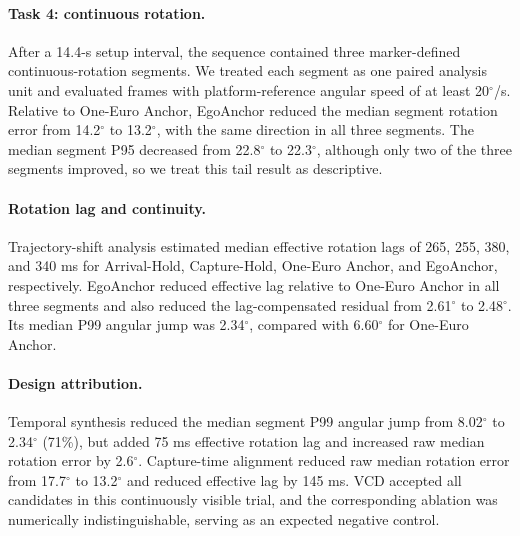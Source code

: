 \paragraph{Task 4: continuous rotation.}
After a 14.4-s setup interval, the sequence contained three
marker-defined continuous-rotation segments. We treated each segment as one
paired analysis unit and evaluated frames with platform-reference angular speed
of at least 20$^\circ$/s. Relative to One-Euro
Anchor, EgoAnchor reduced the median segment rotation error from
14.2$^\circ$ to
13.2$^\circ$, with the same
direction in all three segments. The median segment P95 decreased from
22.8$^\circ$ to
22.3$^\circ$, although only
two of the three segments improved, so we treat this tail result as descriptive.

\paragraph{Rotation lag and continuity.}
Trajectory-shift analysis estimated median effective rotation lags of
265,
255,
380,
and 340 ms
for Arrival-Hold, Capture-Hold, One-Euro Anchor, and EgoAnchor, respectively.
EgoAnchor reduced effective lag relative to One-Euro Anchor in all three
segments and also reduced the lag-compensated residual from
2.61$^\circ$
to 2.48$^\circ$.
Its median P99 angular jump was
2.34$^\circ$,
compared with
6.60$^\circ$
for One-Euro Anchor.

\paragraph{Design attribution.}
Temporal synthesis reduced the median segment P99 angular jump from
8.02$^\circ$ to
2.34$^\circ$
(71\%), but added
75 ms effective rotation lag and
increased raw median rotation error by
2.6$^\circ$. Capture-time alignment reduced raw
median rotation error from 17.7$^\circ$ to
13.2$^\circ$ and reduced effective lag by
145
ms. VCD accepted all candidates in this continuously visible trial, and the
corresponding ablation was numerically indistinguishable, serving as an expected
negative control.
